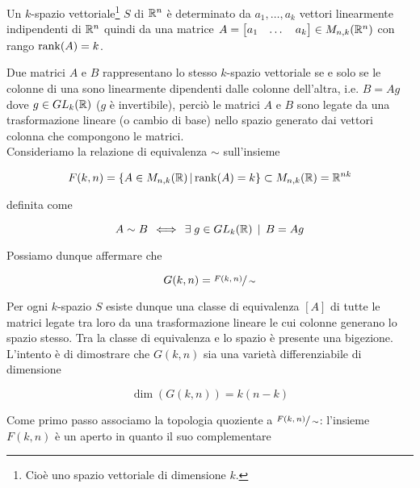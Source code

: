 \begin{remark}
	Un $ k $-spazio vettoriale\footnote{%
		Cioè uno spazio vettoriale di dimensione $ k $.%
	} $ S $ di $ \mathbb{R}^{n} $ è determinato da $ a_{1},\dots,a_{k} $ vettori linearmente indipendenti di $ \mathbb{R}^{n} $ quindi da una matrice $ A = \begin{bmatrix} a_{1} & \dots & a_{k} \end{bmatrix} \in M_{n,k}(\mathbb{R}^{n}) $ con rango $ \rank(A) = k $.
\end{remark}

Due matrici $ A $ e $ B $ rappresentano lo stesso $ k $-spazio vettoriale se e solo se le colonne di una sono linearmente dipendenti dalle colonne dell'altra, i.e. $ B = A g $ dove $ g \in GL_{k}(\mathbb{R}) $ ($ g $ è invertibile), perciò le matrici $ A $ e $ B $ sono legate da una trasformazione lineare (o cambio di base) nello spazio generato dai vettori colonna che compongono le matrici.\\
Consideriamo la relazione di equivalenza $ \sim $ sull'insieme

\begin{equation}
	F(k,n) = \left\{ A \in M_{n,k}(\mathbb{R}) \, \middle| \, \rank(A) = k \right\} \subset M_{n,k}(\mathbb{R}) = \mathbb{R}^{nk}
\end{equation}

definita come

\begin{equation}
	A \sim B \, \iff \, \exists \; g \in GL_{k}(\mathbb{R}) \, \mid \, B = A g
\end{equation}

Possiamo dunque affermare che

\begin{equation}
	G(k,n) = \sfrac{F(k,n)}{\sim}
\end{equation}

Per ogni $ k $-spazio $ S $ esiste dunque una classe di equivalenza $ [A] $ di tutte le matrici legate tra loro da una trasformazione lineare le cui colonne generano lo spazio stesso. Tra la classe di equivalenza e lo spazio è presente una bigezione.\\
L'intento è di dimostrare che $ G(k,n) $ sia una varietà differenziabile di dimensione

\begin{equation}
	\dim (G(k,n)) = k (n-k)
\end{equation}

Come primo passo associamo la topologia quoziente a $ \sfrac{F(k,n)}{\sim} $: l'insieme $ F(k,n) $ è un aperto in quanto il suo complementare

